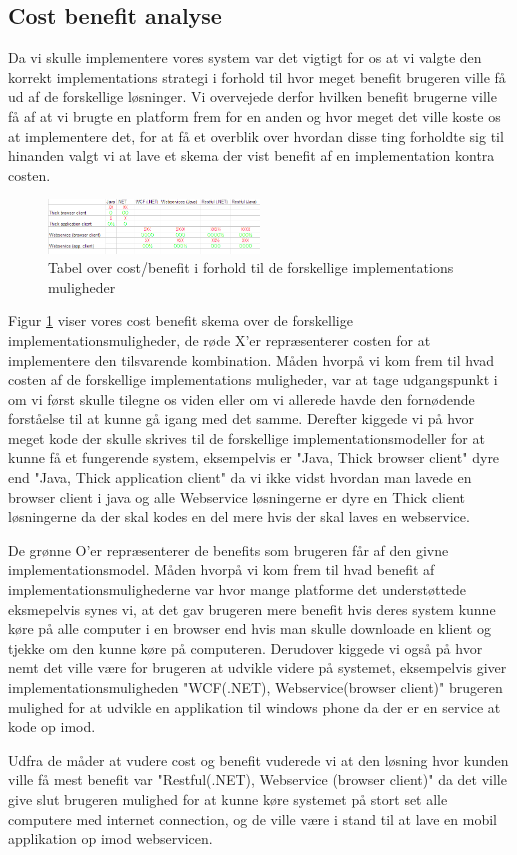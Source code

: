 \subsection{Cost benefit analyse}
\label{Cost_Ben}
Da vi skulle implementere vores system var det vigtigt for os at vi valgte den korrekt implementations strategi i forhold til hvor meget benefit brugeren ville få ud af de forskellige løsninger. Vi overvejede derfor hvilken benefit brugerne ville få af at vi brugte en platform frem for en anden  og hvor meget det ville koste os at implementere det, for at få et overblik over hvordan disse ting forholdte sig til hinanden valgt vi at lave et skema der vist benefit af en implementation kontra costen.

\begin{figure}[h!]
  \centering
    \includegraphics[width=0.5\textwidth]{Appendix/GUI-Prototype/CostBenefit}
  \caption{Tabel over cost/benefit i forhold til de forskellige implementations muligheder}
\label{Cost_Ben}
\end{figure} 

Figur \ref{Cost_Ben} viser vores cost benefit skema over de forskellige implementationsmuligheder, de røde X'er repræsenterer costen for at implementere den tilsvarende kombination. Måden hvorpå vi kom frem til hvad costen af de forskellige implementations muligheder, var at tage udgangspunkt i om vi først skulle tilegne os viden eller om vi allerede havde den fornødende forståelse til at kunne gå igang med det samme. Derefter kiggede vi på hvor meget kode der skulle skrives til de forskellige implementationsmodeller for at kunne få et fungerende system, eksempelvis er "Java, Thick browser client" dyre end "Java, Thick application client" da vi ikke vidst hvordan man lavede en browser client i java og alle Webservice løsningerne er dyre en Thick client løsningerne da der skal kodes en del mere hvis der skal laves en webservice.

De grønne O'er repræsenterer de benefits som brugeren får af den givne implementationsmodel. Måden hvorpå vi kom frem til hvad benefit af implementationsmulighederne var hvor mange platforme det understøttede eksmepelvis synes vi, at det gav brugeren mere benefit hvis deres system kunne køre på alle computer i en browser end hvis man skulle downloade en klient og tjekke om den kunne køre på computeren. Derudover kiggede vi også på hvor nemt det ville være for brugeren at udvikle videre på systemet, eksempelvis giver implementationsmuligheden "WCF(.NET), Webservice(browser client)" brugeren mulighed for at udvikle en applikation til windows phone da der er en service at kode op imod.

Udfra de måder at vudere cost og benefit vuderede vi at den løsning hvor kunden ville få mest benefit var "Restful(.NET), Webservice (browser client)" da det ville give slut brugeren mulighed for at kunne køre systemet på stort set alle computere med internet connection, og de ville være i stand til at lave en mobil applikation op imod webservicen.

 